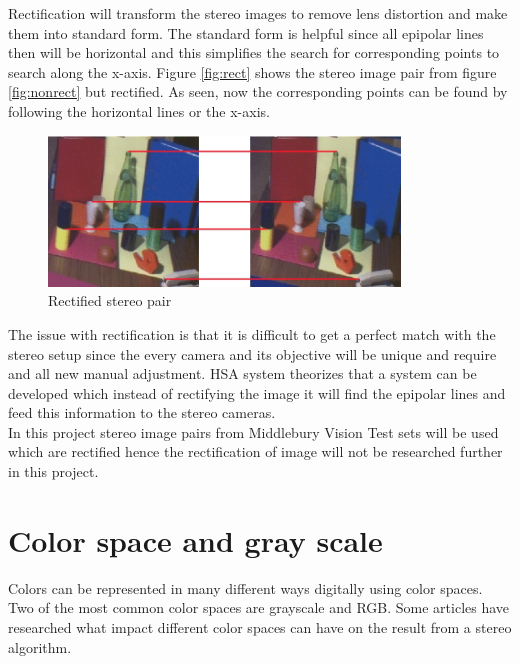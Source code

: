 Rectification will transform the stereo images to remove lens distortion and make them into standard form. The standard form is helpful since all epipolar lines then will be horizontal and this simplifies the search for corresponding points to search along the x-axis. Figure \vref{fig:rect} shows the stereo image pair from figure \vref{fig:nonrect} but rectified. As seen, now the corresponding points can be found by following the horizontal lines or the x-axis.\\

\begin{figure}[ht!]
  \centering
  \includegraphics[height=4cm]{figures/rect}
  \caption{Rectified stereo pair\label{fig:rect} \cite{Mattoccia2013}}
\end{figure}

The issue with rectification is that it is difficult to get a perfect match with the stereo setup since the every camera and its objective will be unique and require and all new manual adjustment. HSA system theorizes that a system can be developed which instead of rectifying the image it will find the epipolar lines and feed this information to the stereo cameras.\\

In this project stereo image pairs from Middlebury Vision Test sets \cite{middlebury2016} will be used which are rectified hence the rectification of image will not be researched further in this project.

\section{Color space and gray scale}
Colors can be represented in many different ways digitally using color spaces. Two of the most common color spaces are grayscale and RGB. Some articles have researched what impact different color spaces can have on the result from a stereo algorithm.\\ 

